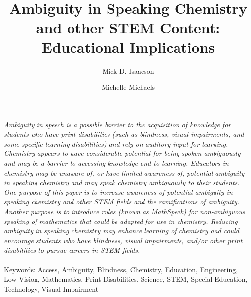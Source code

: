 \documentclass[11.5pt]{sig-alternate} %
\makeatletter
\let\oldabstract\abstract
\let\oldendabstract\endabstract
\renewenvironment{abstract} %
{\renewenvironment{quotation}%
               {\list{}{\addtolength{\leftmargin}{1em} %
                        \listparindent 1.5em%
                        \itemindent    \listparindent%
                        \rightmargin   \leftmargin%
                        \parsep        \z@ \@plus\p@}%
                \item\relax}%
               {\endlist}%
\oldabstract}
{\oldendabstract}
\makeatother
\begin{document}
\title{Ambiguity in Speaking Chemistry and other STEM Content:
Educational Implications}

\author[1]{\large \color{blue}Mick D. Isaacson}
\author[2]{\large \color{blue}Michelle Michaels}


\toappear{}
\maketitle
\begin{@twocolumnfalse} 
\begin{abstract}
\item 
\textit{Ambiguity in speech is a possible barrier to the acquisition of knowledge for students who have print disabilities (such as blindness, visual impairments, and some specific learning disabilities) and rely on auditory input for learning. Chemistry appears to have considerable potential for being spoken ambiguously and may be a barrier to accessing knowledge and to learning. Educators in chemistry may be unaware of, or have limited awareness of, potential ambiguity in speaking chemistry and may speak chemistry ambiguously to their students. One purpose of this paper is to increase awareness of potential ambiguity in speaking chemistry and other STEM fields and the ramifications of ambiguity. Another purpose is to introduce rules (known as MathSpeak) for non-ambiguous speaking of mathematics that could be adapted for use in chemistry. Reducing ambiguity in speaking chemistry may enhance learning of chemistry and could encourage students who have blindness, visual impairments, and/or other print disabilities to pursue careers in STEM fields.}
\\ \\
Keywords: Access, Ambiguity, Blindness, Chemistry, Education, Engineering, Low Vision,
Mathematics, Print Disabilities, Science, STEM, Special Education, Technology, Visual
Impairment
\end{abstract}
\end{@twocolumnfalse}

\end{document}
